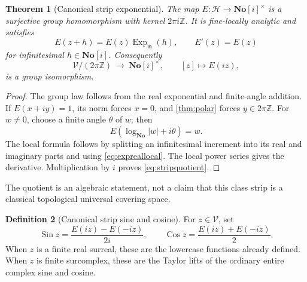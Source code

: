 \documentclass[11pt]{article}
\numberwithin{equation}{section}
\newtheorem{theorem}{Theorem}[section]
\theoremstyle{definition}
\newtheorem{definition}[theorem]{Definition}
\newcommand{\No}{\mathbf{No}}
\newcommand{\SC}{\mathbf{No}[i]}
\newcommand{\Z}{\mathbb Z}
\newcommand{\mm}{\mathfrak m}
\newcommand{\Ex}{\operatorname{Exp}_{\mm}}
\newcommand{\Sin}{\operatorname{Sin}}
\newcommand{\Cos}{\operatorname{Cos}}
\begin{document}
\begin{theorem}[Canonical strip exponential]\label{thm:stripexp}
The map $E:\mathscr H\to\SC^\times$ is a surjective group homomorphism with kernel $2\pi i\Z$. It is fine-locally analytic and satisfies
\[
 E(z+h)=E(z)\Ex(h),\qquad E'(z)=E(z)
\]
for infinitesimal $h\in\SC$. Consequently
\begin{equation}\label{eq:stripquotient}
 \mathscr V/(2\pi\Z)\ \longrightarrow\ \SC^\times,
 \qquad [z]\longmapsto E(iz),
\end{equation}
is a group isomorphism.
\end{theorem}
\begin{proof}
The group law follows from the real exponential and finite-angle addition. If $E(x+iy)=1$, its norm forces $x=0$, and \cref{thm:polar} forces $y\in2\pi\Z$. For $w\ne0$, choose a finite angle $\theta$ of $w$; then
\[
 E(\log_{\No}|w|+i\theta)=w.
\]
The local formula follows by splitting an infinitesimal increment into its real and imaginary parts and using \eqref{eq:expreallocal}. The local power series gives the derivative. Multiplication by $i$ proves \eqref{eq:stripquotient}.
\end{proof}
The quotient is an algebraic statement, not a claim that this class strip is a classical topological universal covering space.

\begin{definition}[Canonical strip sine and cosine]
For $z\in\mathscr V$, set
\begin{equation}\label{eq:stripsincos}
 \Sin z=\frac{E(iz)-E(-iz)}{2i},\qquad
 \Cos z=\frac{E(iz)+E(-iz)}2.
\end{equation}
When $z$ is a finite real surreal, these are the lowercase functions already defined. When $z$ is finite surcomplex, these are the Taylor lifts of the ordinary entire complex sine and cosine.
\end{definition}
\end{document}
